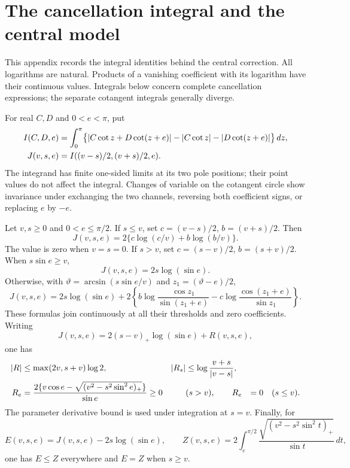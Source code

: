 \section{The cancellation integral and the central model}
\label{app:model-estimates}

This appendix records the integral identities behind the central correction.
All logarithms are natural. Products of a vanishing coefficient with its
logarithm have their continuous values. Integrals below concern complete
cancellation expressions; the separate cotangent integrals generally diverge.

For real $C,D$ and $0<e<\pi$, put
\begin{align}\label{eq:generic-I}
 I(C,D,e)&=\int_0^\pi\bigl\{|C\cot z+D\cot(z+e)|
                  -|C\cot z|-|D\cot(z+e)|\bigr\}\,dz,
 \\
 J(v,s,e)&=I((v-s)/2,(v+s)/2,e).\notag
\end{align}
The integrand has finite one-sided limits at its two pole positions; their
point values do not affect the integral. Changes of variable on the
cotangent circle show invariance under exchanging the two channels,
reversing both coefficient signs, or replacing $e$ by $-e$.

\begin{lemma}\label{lem:generic-cancellation}
Let $v,s\geq0$ and $0<e\leq\pi/2$. If $s\leq v$, set
$c=(v-s)/2$, $b=(v+s)/2$. Then
\begin{equation}\label{eq:J-same-sign}
 J(v,s,e)=2\{c\log(c/v)+b\log(b/v)\}.
\end{equation}
The value is zero when $v=s=0$. If $s>v$, set
$c=(s-v)/2$, $b=(s+v)/2$. When $s\sin e\geq v$,
\begin{equation}\label{eq:J-no-root}
 J(v,s,e)=2s\log(\sin e).
\end{equation}
Otherwise, with $\vartheta=\arcsin(s\sin e/v)$ and
$z_1=(\vartheta-e)/2$,
\begin{equation}\label{eq:J-root}
 J(v,s,e)=2s\log(\sin e)+2\left\{
 b\log\frac{\cos z_1}{\sin(z_1+e)}
 -c\log\frac{\cos(z_1+e)}{\sin z_1}\right\}.
\end{equation}
These formulas join continuously at all their thresholds and zero
coefficients. Writing
\begin{equation}\label{eq:J-R}
 J(v,s,e)=2(s-v)_+\log(\sin e)+R(v,s,e),
\end{equation}
one has
\begin{align}\label{eq:J-R-bounds}
 |R|&\leq\max(2v,s+v)\log2,&
 |R_s|&\leq\log\frac{v+s}{|v-s|},\\
 R_e&=\frac{2\{v\cos e-\sqrt{(v^2-s^2\sin^2e)_+}\}}{\sin e}
       \geq0 &&(s>v),\notag
 \qquad R_e&=0 &&(s\leq v).\notag
\end{align}
The parameter derivative bound is used under integration at $s=v$.
Finally, for
\begin{equation}\label{eq:root-Z}
 E(v,s,e)=J(v,s,e)-2s\log(\sin e),\qquad
 Z(v,s,e)=2\int_e^{\pi/2}
          \frac{\sqrt{(v^2-s^2\sin^2t)_+}}{\sin t}\,dt,
\end{equation}
one has $E\leq Z$ everywhere and $E=Z$ when $s\geq v$.
\end{lemma}

